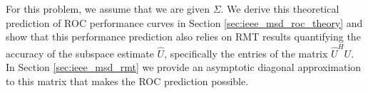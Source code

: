 For this problem, we assume that we are given $\Sigma$. We derive this theoretical prediction of ROC performance curves in Section \ref{sec:ieee_msd_roc_theory} and show that this performance prediction also relies on RMT results quantifying the accuracy of the subspace estimate $\widehat{U}$, specifically the entries of the matrix $\widehat{U}^HU$. In Section \ref{sec:ieee_msd_rmt} we provide an asymptotic diagonal approximation to this matrix that makes the ROC prediction possible.

